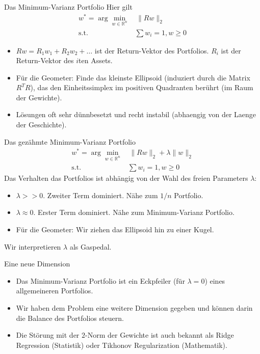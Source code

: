 \documentclass[10pt]{beamer}
\newcommand{\R}{\mathbb R}
\providecommand{\norm}[1]{\lVert#1\rVert}
\begin{document}
\begin{frame}{Das Minimum-Varianz Portfolio}
Hier gilt
\begin{align}
w^*=\arg\min_{w\in\R^n}&\, \norm{Rw}_2 \\
\text{s.t. }&\sum w_i = 1, w\geq 0\nonumber
\end{align}

\begin{itemize}
\item $Rw = R_1 w_1 + R_2 w_2 + \ldots$ ist der Return-Vektor des Portfolios. $R_i$ ist der Return-Vektor des $i$ten Assets.
\item Für die Geometer: Finde das kleinste Ellipsoid (induziert durch die Matrix $R^T R$), das den Einheitssimplex im positiven Quadranten berührt (im Raum der Gewichte).
\item Lösungen oft sehr dünnbesetzt und recht instabil (abhaengig von der Laenge der Geschichte).
\end{itemize}
\end{frame}


\begin{frame}{Das gezähmte Minimum-Varianz Portfolio}
\begin{align}
w^*=\arg\min_{w\in\R^n}&\, \norm{Rw}_2 + \lambda \norm{w}_2 \\
\text{s.t. }&\sum w_i = 1, w\geq 0\nonumber
\end{align}
Das Verhalten das Portfolios ist abhängig von der Wahl des freien Parameters $\lambda$:
\begin{itemize}
\item $\lambda >> 0$. Zweiter Term dominiert. Nähe zum $1/n$ Portfolio.
\item $\lambda \approx 0$. Erster Term dominiert. Nähe zum Minimum-Varianz Portfolio.
\item Für die Geometer: Wir ziehen das Ellipsoid hin zu einer Kugel.
\end{itemize}
Wir interpretieren $\lambda$ als Gaspedal. 
\end{frame}

\begin{frame}{Eine neue Dimension}
\begin{itemize}
\item Das Minimum-Varianz Portfolio ist ein Eckpfeiler (für $\lambda = 0$) eines allgemeineren Portfolios.
\item Wir haben dem Problem eine weitere Dimension gegeben und können darin die Balance des Portfolios steuern. 
\item Die Störung mit der $2$-Norm der Gewichte ist auch bekannt als Ridge Regression (Statistik) oder Tikhonov Regularization (Mathematik).
\end{itemize}
\end{frame}
\end{document}

